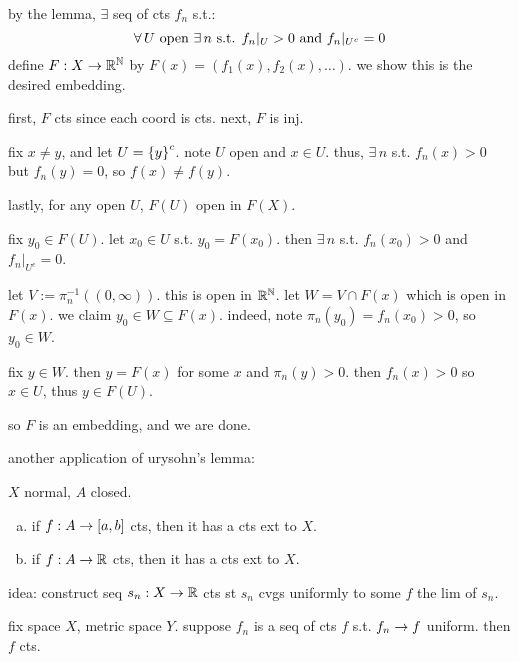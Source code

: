 by the lemma, $\exists$ seq of cts $f_{n}$ s.t.:
\begin{equation*}
    \forall \, U \textrm{ open } \exists \, n \textrm{ s.t. }
    f_{n}\rvert_{U}>0 \textrm{ and } f_{n}\rvert_{U^{c}}=0
\end{equation*}
define $F:X\rightarrow\mathbb{R}^{\mathbb{N}}$ by $F(x)=(f_{1}(x),f_{2}(x),\dots)$.
we show this is the desired embedding.

first, $F$ cts since each coord is cts.
next, $F$ is inj.
\begin{block}
    fix $x\neq y$, and let $U=\left\{{y}\right\}^{c}$. note $U$ open and $x\in U$.
    thus, $\exists \, n$ s.t. $f_{n}(x)>0$ but $f_{n}(y)=0$, so $f(x)\neq f(y)$.
\end{block}
lastly, for any open $U$, $F(U)$ open in $F(X)$.
\begin{block}
    fix $y_{0}\in F(U)$. let $x_{0}\in U$ s.t. $y_{0}=F(x_{0})$.
    then $\exists \, n$ s.t. $f_{n}(x_{0})>0$ and $f_{n}\rvert_{U^{c}}=0$.

    let $V:=\pi_{n}^{-1}((0,\infty))$. this is open in $\mathbb{R}^{\mathbb{N}}$.
    let $W=V\cap F(x)$ which is open in $F(x)$.
    we claim $y_{0}\in W\subseteq F(x)$.
    indeed, note $\pi_{n}(y_{0})=f_{n}(x_{0})>0$, so $y_{0}\in W$.

    fix $y\in W$. then $y=F(x)$ for some $x$ and $\pi_{n}(y)>0$.
    then $f_{n}(x)>0$ so $x\in U$, thus $y\in F(U)$.
\end{block}
so $F$ is an embedding, and we are done.

another application of urysohn's lemma:
\begin{thm}[title=Tietze's Extension Theorem]
    $X$ normal, $A$ closed. \vspace{-4mm}
    \begin{enumerate}[(a)]
        \item if $f:A\rightarrow[a,b]$ cts, then it has a cts ext to $X$.
        \item if $f:A\rightarrow\mathbb{R}$ cts, then it has a cts ext to $X$.
    \end{enumerate}
\end{thm}
idea: construct seq $s_{n}:X\rightarrow\mathbb{R}$ cts st $s_{n}$ cvgs uniformly to some $f$
the lim of $s_{n}$.

\newpage
\begin{lm}
    fix space $X$, metric space $Y$.
    suppose $f_{n}$ is a seq of cts $f$ s.t. $f_{n}\rightarrow f$ uniform.
    then $f$ cts.
\end{lm} \

